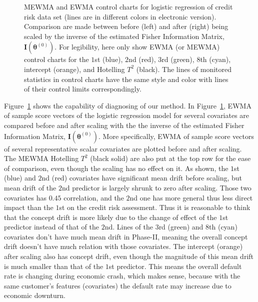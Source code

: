 \documentclass[twoside,11pt]{article}
\begin{document}
\begin{figure}[!htbp]
  \caption{
  MEWMA and EWMA control charts for logistic regression of credit risk data set (lines are in different colors in electronic version). Comparison are made between before (left) and after (right) being scaled by the inverse of the estimated Fisher Information Matrix, $\mathbf {I} ( {\bm{\theta}} ^{(0)})$. For legibility, here only show EWMA (or MEWMA) control charts for the $1$st (blue), $2$nd (red), $3$rd (green), $8$th (cyan), intercept (orange), and Hotelling $T^2$ (black). The lines of monitored statistics in control charts have the same style and color with lines of their control limits correspondingly.
}
\label{fig:credit_default_diag}
\end{figure}

Figure~\ref{fig:credit_default_diag} shows the capability of diagnosing of our method. In Figure~\ref{fig:credit_default_diag}, EWMA of sample score vectors of the logistic regression model for several covariates are compared before and after scaling with the the inverse of the estimated Fisher Information Matrix, $\mathbf {I} ( {\bm{\theta}} ^{(0)})$. More specifically, EWMA of sample score vectors of several representative scalar covariates are plotted before and after scaling. The MEWMA Hotelling $T^2$ (black solid) are also put at the top row for the ease of comparison, even though the scaling has no effect on it. As shown, the $1$st (blue) and $2$nd (red) covariates have significant mean drift before scaling, but mean drift of the $2$nd predictor is largely shrunk to zero after scaling. Those two covariates has $0.45$ correlation, and the $2$nd one has more general thus less direct impact than the $1$st on the credit risk assessment. Thus it is reasonable to think that the concept drift is more likely due to the change of effect of the $1$st predictor instead of that of the $2$nd. Lines of the $3$rd (green) and $8$th (cyan) covariates don't have much mean drift in Phase-II, meaning the overall concept drift doesn't have much relation with those covariates. The intercept (orange) after scaling also has concept drift, even though the magnitude of this mean drift is much smaller than that of the $1$st predictor. This means the overall default rate is changing during economic crash, which makes sense, because with the same customer's features (covariates) the default rate may increase due to economic downturn. 
\end{document}
